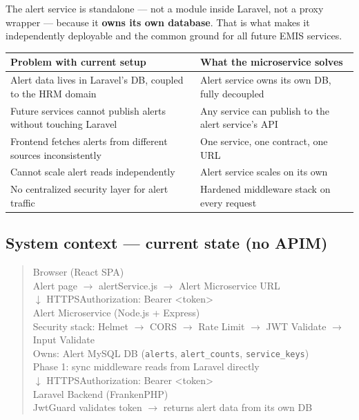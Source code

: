 \documentclass[11pt]{article}
\begin{document}
The alert service is standalone --- not a module inside Laravel, not a proxy wrapper ---
because it \textbf{owns its own database}. That is what makes it independently deployable and
the common ground for all future EMIS services.

\begin{table}[h]
\small
\begin{tabularx}{\textwidth}{X X}
\toprule
\textbf{Problem with current setup} & \textbf{What the microservice solves} \\
\midrule
Alert data lives in Laravel's DB, coupled to the HRM domain
  & Alert service owns its own DB, fully decoupled \\
Future services cannot publish alerts without touching Laravel
  & Any service can publish to the alert service's API \\
Frontend fetches alerts from different sources inconsistently
  & One service, one contract, one URL \\
Cannot scale alert reads independently
  & Alert service scales on its own \\
No centralized security layer for alert traffic
  & Hardened middleware stack on every request \\
\bottomrule
\end{tabularx}
\end{table}

\subsection{System context --- current state (no APIM)}

\begin{quote}
\small\ttfamily
Browser (React SPA) \\
\hspace*{1em}Alert page $\rightarrow$ alertService.js $\rightarrow$ Alert Microservice URL \\[4pt]
$\downarrow$ HTTPS\quad Authorization: Bearer \textless token\textgreater \\[4pt]
Alert Microservice (Node.js + Express) \\
\hspace*{1em}Security stack: Helmet $\rightarrow$ CORS $\rightarrow$ Rate Limit $\rightarrow$ JWT Validate $\rightarrow$ Input Validate \\
\hspace*{1em}Owns: Alert MySQL DB (\texttt{alerts}, \texttt{alert\_counts}, \texttt{service\_keys}) \\
\hspace*{1em}Phase 1: sync middleware reads from Laravel directly \\[4pt]
$\downarrow$ HTTPS\quad Authorization: Bearer \textless token\textgreater \\[4pt]
Laravel Backend (FrankenPHP) \\
\hspace*{1em}JwtGuard validates token $\rightarrow$ returns alert data from its own DB
\end{quote}
\end{document}

